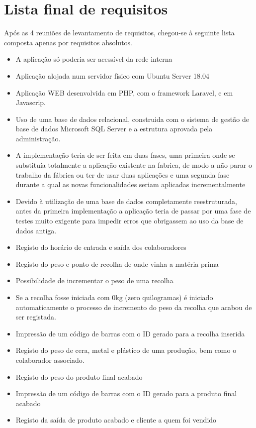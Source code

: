 \section{Lista final de requisitos}
Após as 4 reuniões de levantamento de requisitos, chegou-se à seguinte lista composta apenas por requisitos absolutos.
\begin{itemize}
    \item A aplicação só poderia ser acessível da rede interna
    \item Aplicação alojada num servidor físico com Ubuntu Server 18.04
    \item Aplicação WEB desenvolvida em PHP, com o framework Laravel, e em Javascrip.
    \item Uso de uma base de dados relacional, construida com o sistema de gestão de base de dados Microsoft SQL Server e a estrutura aprovada pela administração.
    \item A implementação teria de ser feita em duas fases, uma primeira onde se substituía totalmente a aplicação existente na fabrica, de modo a não parar o trabalho da fábrica ou ter de usar duas aplicações e uma segunda fase durante a qual as novas funcionalidades seriam aplicadas incrementalmente
    \item Devido à utilização de uma base de dados completamente reestruturada, antes da primeira implementação a aplicação teria de passar por uma fase de testes muito exigente para impedir erros que obrigassem ao uso da base de dados antiga.
    \item Registo do horário de entrada e saída dos colaboradores
    \item Registo do peso e ponto de recolha de onde vinha a matéria prima
    \item Possibilidade de incrementar o peso de uma recolha
    \item Se a recolha fosse iniciada com 0kg (zero quilogramas) é iniciado automaticamente o processo de incremento do peso da recolha que acabou de ser registada.
    \item Impressão de um código de barras com o ID gerado para a recolha inserida
    \item Registo do peso de cera, metal e plástico de uma produção, bem como o colaborador associado.
    \item Registo do peso do produto final acabado
    \item Impressão de um código de barras com o ID gerado para a produto final acabado
    \item Registo da saída de produto acabado e cliente a quem foi vendido

\end{itemize}

